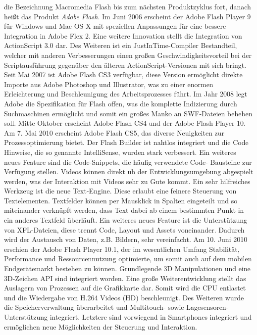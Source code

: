 die Bezeichnung Macromedia Flash bis zum nächsten Produktzyklus fort,
danach heißt das Produkt \emph{Adobe Flash}.
Im Juni 2006 erscheint der Adobe Flash Player 9 für Windows und Mac OS X mit
speziellen Anpassungen für eine bessere Integration in Adobe Flex 2. Eine
weitere Innovation stellt die Integration von ActionScript 3.0 dar. Des
Weiteren ist ein JustInTime-Compiler Bestandteil, welcher mit anderen
Verbesserungen einen großen Geschwindigkeitsvorteil bei der Scriptausführung
gegenüber den älteren ActionScript-Versionen mit sich bringt. Seit Mai 2007
ist Adobe Flash CS3 verfügbar, diese Version ermöglicht direkte Importe aus
Adobe Photoshop und Illustrator, was zu einer enormen Erleichterung und
Beschleunigung des Arbeitsprozesses führt. Im Jahr 2008 legt Adobe die
Spezifikation für Flash offen, was die komplette Indizierung durch
Suchmaschinen ermöglicht und somit ein großes Manko an SWF-Dateien beheben
soll. Mitte Oktober erscheint Adobe Flash CS4 und der Adobe Flash Player 10.
Am 7. Mai 2010 erscheint Adobe Flash CS5, das diverse Neuigkeiten zur
Prozessoptimierung bietet. Der Flash Builder ist nahtlos integriert und die
Code Hinweise, die so genannte IntelliSense, wurden stark verbessert. Ein
weiteres neues Feature sind die Code-Snippets, die häufig verwendete Code-
Bausteine zur Verfügung stellen. Videos können direkt ub der
Entwicklungsumgebung abgespielt werden, was der Interaktion mit Videos sehr
zu Gute kommt. Ein sehr hilfreiches Werkzeug ist die neue Text-Engine. Diese
erlaubt eine feinere Steuerung von Textelementen. Textfelder können per
Mausklick in Spalten eingeteilt und so miteinander verknüpft werden, dass
Text dabei ab einem bestimmten Punkt in ein anderes Textfeld überläuft. Ein
weiteres neues Feature ist die Unterstützung von XFL-Dateien, diese trennt
Code, Layout und Assets voneinander. Dadurch wird der Austausch von Daten,
z.B. Bildern, sehr vereinfacht.
Am 10. Juni 2010 erschien der Adobe Flash Player 10.1, der im wesentlichen
Umfang Stabilität, Performance und Ressourcennutzung optimierte, um somit
auch auf dem mobilen Endgerätemarkt bestehen zu können. Grundlegende 3D
Manipulationen und eine 3D-Zeichen API sind integriert worden. Eine große
Weiterentwicklung stellt das Auslagern von Prozessen auf die Grafikkarte dar.
Somit wird die CPU entlastet und die Wiedergabe von H.264 Videos (HD)
beschleunigt. Des Weiteren wurde die Speicherverwaltung überarbeitet und
Multitouch- sowie Lagesensoren-Unterstützung integriert. Letztere sind
vorwiegend in Smartphones integriert und ermöglichen neue Möglichkeiten der
Steuerung und Interaktion.
